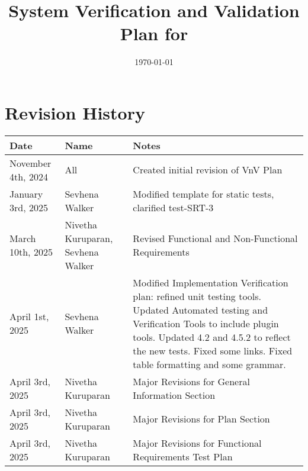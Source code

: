 \documentclass[12pt, titlepage]{article}
\begin{document}
\title{System Verification and Validation Plan for \progname{}}
\author{\authname}
\date{\today}

\maketitle


\section*{Revision History}

\begin{tabularx}{\textwidth}{p{4cm}p{4cm}X}
  \toprule {\bf Date} & {\bf Name} & {\bf Notes}\\
  \midrule
  November 4th, 2024 & All & Created initial revision of VnV Plan\\
January 3rd, 2025 & Sevhena Walker & Modified template for static tests, clarified test-SRT-3\\
  March 10th, 2025 & Nivetha Kuruparan, Sevhena Walker & Revised Functional and Non-Functional Requirements\\
  April 1st, 2025 & Sevhena Walker & Modified Implementation Verification plan: refined unit testing tools. Updated Automated testing and Verification Tools to include plugin tools. Updated 4.2 and 4.5.2 to reflect the new tests. Fixed some links. Fixed table formatting and some grammar.\\
  April 3rd, 2025 & Nivetha Kuruparan & Major Revisions for General Information Section\\
  April 3rd, 2025 & Nivetha Kuruparan & Major Revisions for Plan Section\\
  April 3rd, 2025 & Nivetha Kuruparan & Major Revisions for Functional Requirements Test Plan\\
  \bottomrule
\end{tabularx}

~\\
\end{document}

